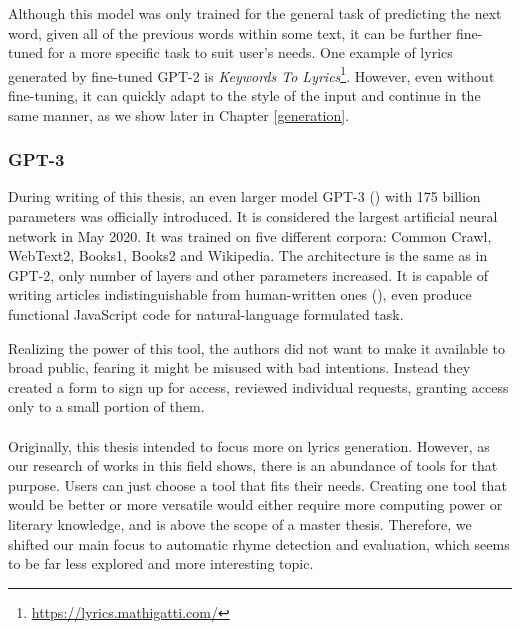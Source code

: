 Although this model was only trained for the general task of predicting the next word, given all of the previous words within some text, it can be further fine-tuned for a more specific task to suit user's needs. One example of lyrics generated by fine-tuned GPT-2 is \textit{Keywords To Lyrics}\footnote{\url{https://lyrics.mathigatti.com/}}. However, even without fine-tuning, it can quickly adapt to the style of the input and continue in the same manner, as we show later in Chapter \ref{generation}.


\subsubsection*{GPT-3}
During writing of this thesis, an even larger model GPT-3 (\cite{brown2020gpt3}) with 175 billion parameters was officially introduced. It is considered the largest artificial neural network in May 2020. It was trained on five different corpora: Common Crawl, WebText2, Books1, Books2 and Wikipedia. The architecture is the same as in GPT-2, only number of layers and other parameters increased. It is capable of writing articles indistinguishable from human-written ones (\cite{gpt-3_overview}), even produce functional JavaScript code for natural-language formulated task.

Realizing the power of this tool, the authors did not want to make it available to broad public, fearing it might be misused with bad intentions. Instead they created a form to sign up for access, reviewed individual requests, granting access only to a small portion of them.



\paragraph{}Originally, this thesis intended to focus more on lyrics generation. However, as our research of works in this field shows, there is an abundance of tools for that purpose. Users can just choose a tool that fits their needs. Creating one tool that would be better or more versatile would either require more computing power or literary knowledge, and is above the scope of a master thesis. Therefore, we shifted our main focus to automatic rhyme detection and evaluation, which seems to be far less explored and more interesting topic.


